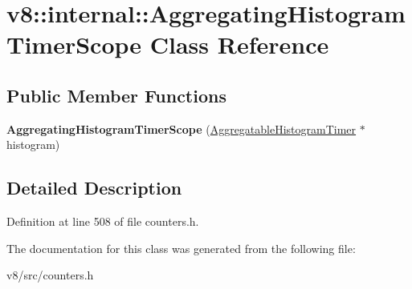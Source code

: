 \hypertarget{classv8_1_1internal_1_1AggregatingHistogramTimerScope}{}\section{v8\+:\+:internal\+:\+:Aggregating\+Histogram\+Timer\+Scope Class Reference}
\label{classv8_1_1internal_1_1AggregatingHistogramTimerScope}
\subsection*{Public Member Functions}
\begin{DoxyCompactItemize}
\item 
\mbox{\label{classv8_1_1internal_1_1AggregatingHistogramTimerScope_a96403652799814786ac2fc73d2cbb2ce}} 
{\bfseries Aggregating\+Histogram\+Timer\+Scope} (\mbox{\hyperlink{classv8_1_1internal_1_1AggregatableHistogramTimer}{Aggregatable\+Histogram\+Timer}} $\ast$histogram)
\end{DoxyCompactItemize}


\subsection{Detailed Description}


Definition at line 508 of file counters.\+h.



The documentation for this class was generated from the following file\+:\begin{DoxyCompactItemize}
\item 
v8/src/counters.\+h\end{DoxyCompactItemize}
